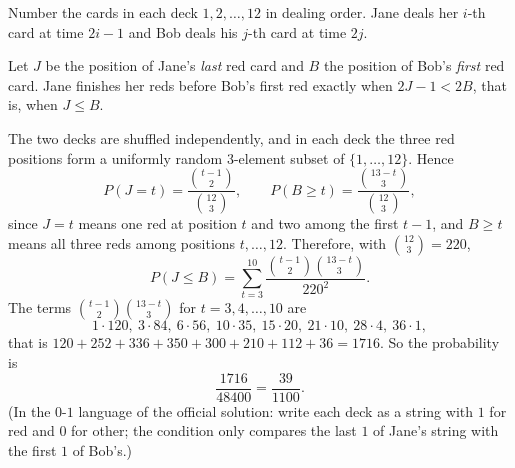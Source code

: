 Number the cards in each deck \(1,2,\dots,12\) in dealing order. Jane deals her \(i\)-th card at time \(2i-1\) and Bob deals his \(j\)-th card at time \(2j\).

Let \(J\) be the position of Jane's \emph{last} red card and \(B\) the position of Bob's \emph{first} red card. Jane finishes her reds before Bob's first red exactly when \(2J-1<2B\), that is, when \(J\le B\).

The two decks are shuffled independently, and in each deck the three red positions form a uniformly random \(3\)-element subset of \(\{1,\dots,12\}\). Hence
\[
P(J=t)=\dfrac{\binom{t-1}{2}}{\binom{12}{3}},\qquad P(B\ge t)=\dfrac{\binom{13-t}{3}}{\binom{12}{3}},
\]
since \(J=t\) means one red at position \(t\) and two among the first \(t-1\), and \(B\ge t\) means all three reds among positions \(t,\dots,12\). Therefore, with \(\binom{12}{3}=220\),
\[
P(J\le B)=\sum_{t=3}^{10}\dfrac{\binom{t-1}{2}\binom{13-t}{3}}{220^2}.
\]
The terms \(\binom{t-1}{2}\binom{13-t}{3}\) for \(t=3,4,\dots,10\) are
\[
1\cdot120,\ 3\cdot84,\ 6\cdot56,\ 10\cdot35,\ 15\cdot20,\ 21\cdot10,\ 28\cdot4,\ 36\cdot1,
\]
that is \(120+252+336+350+300+210+112+36=1716\). So the probability is
\[
\dfrac{1716}{48400}=\boxed{\dfrac{39}{1100}}.
\]
(In the \(0\)-\(1\) language of the official solution: write each deck as a string with \(1\) for red and \(0\) for other; the condition only compares the last \(1\) of Jane's string with the first \(1\) of Bob's.)
